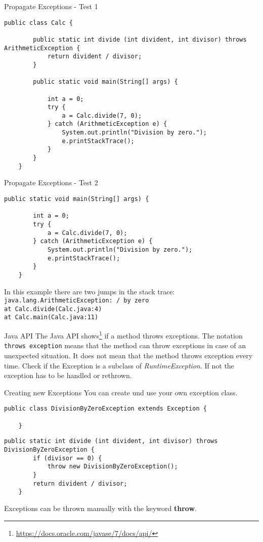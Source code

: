 \begin{frame}[fragile]{Propagate Exceptions - Test 1}
	\begin{lstlisting}[basicstyle=\ttfamily\scriptsize]
	public class Calc {
	
		public static int divide (int divident, int divisor) throws ArithmeticException {
			return divident / divisor;
		}
		
		public static void main(String[] args) {
			
			int a = 0;
			try {
				a = Calc.divide(7, 0);
			} catch (ArithmeticException e) {
				System.out.println("Division by zero.");
				e.printStackTrace();
			}
		}
	}
	\end{lstlisting}
\end{frame}

\begin{frame}[fragile]{Propagate Exceptions - Test 2}
	\begin{lstlisting}[basicstyle=\ttfamily\scriptsize, firstnumber=7]
	public static void main(String[] args) {
		
		int a = 0;
		try {
			a = Calc.divide(7, 0);
		} catch (ArithmeticException e) {
			System.out.println("Division by zero.");
			e.printStackTrace();
		}
	}
	\end{lstlisting}
	In this example there are two jumps in the stack trace:\\
	\texttt{java.lang.ArithmeticException: / by zero}\\
	\texttt{at Calc.divide(Calc.java:4)}\\
	\texttt{at Calc.main(Calc.java:11)}
\end{frame}

\begin{frame}{Java API}
	The Java API shows\footnote{\scriptsize\url{https://docs.oracle.com/javase/7/docs/api/}}
	if a method throws exceptions. 
	The notation \texttt{throws exception} means that the method can throw 
	exceptions in case of an unexpected situation.
	It does not mean that the method throws exception every time.
	\vfill
	Check if the Exception is a subclass of \emph{RuntimeException}. 
	If not the exception has to be handled or rethrown.
\end{frame}

\begin{frame}[fragile]{Creating new Exceptions}
	You can create und use your own exception class.
	\begin{lstlisting}[basicstyle=\ttfamily\scriptsize]
	public class DivisionByZeroException extends Exception {
	
	}
	\end{lstlisting}
	\vfill
	\begin{lstlisting}[basicstyle=\ttfamily\scriptsize]
	public static int divide (int divident, int divisor) throws DivisionByZeroException {
		if (divisor == 0) {
			throw new DivisionByZeroException();
		}
		return divident / divisor;
	}
	\end{lstlisting}	
	Exceptions can be thrown manually with the keyword \textbf{throw}.
\end{frame}

